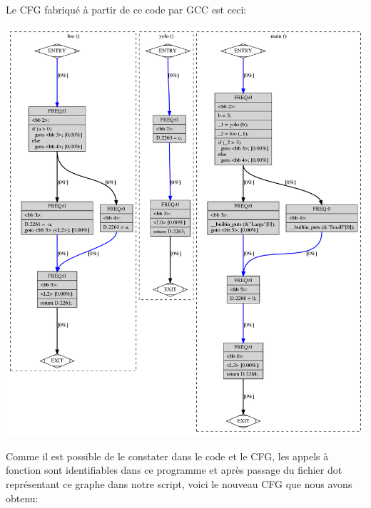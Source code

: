 \pagebreak
Le CFG fabriqué à partir de ce code par GCC est ceci:
\begin{center}
    \includegraphics[scale=0.32]{images/cfg_avant.png}
\end{center}
Comme il est possible de le constater dans le code et le CFG, les appels à fonction sont identifiables dans ce programme et après passage du fichier dot représentant ce graphe dans notre script, voici le nouveau CFG que nous avons obtenu:
